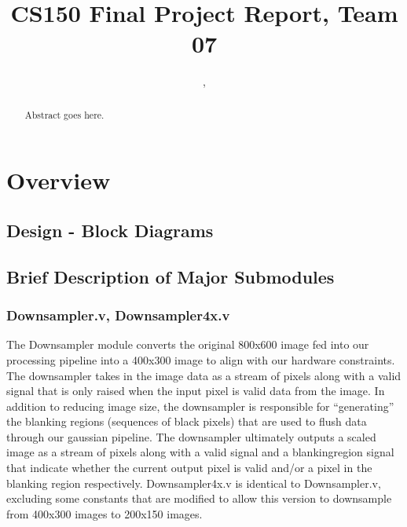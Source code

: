 \documentclass[12pt]{article}
\title{CS150 Final Project Report, Team 07}
\author{\Name, \texttt{\Login}}
\begin{document}
\maketitle

\begin{abstract}

Abstract goes here.

\end{abstract}

\newpage

\section{Overview}


\subsection{Design - Block Diagrams}


\subsection{Brief Description of Major Submodules}

\subsubsection{Downsampler.v, Downsampler4x.v}
The Downsampler module converts the original 800x600 image fed into our processing
pipeline into a 400x300 image to align with our hardware constraints. The downsampler
takes in the image data as a stream of pixels along with a valid signal that is
only raised when the input pixel is valid data from the image. In addition to 
reducing image size, the downsampler is responsible for ``generating'' the 
blanking regions (sequences of black pixels) that are used to flush data 
through our gaussian pipeline. The downsampler ultimately outputs a scaled 
image as a stream of pixels along with a valid signal and a blankingregion 
signal that indicate whether the current output pixel is valid and/or a pixel
in the blanking region respectively. Downsampler4x.v is identical to 
Downsampler.v, excluding some constants that are modified to allow this version 
to downsample from 400x300 images to 200x150 images.
\end{document}
